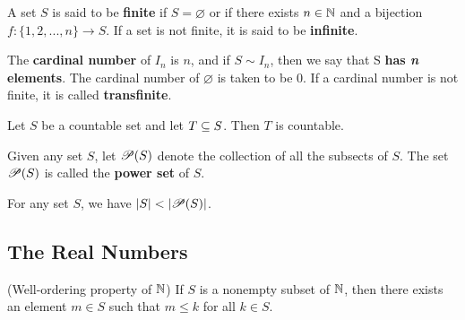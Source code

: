 \documentclass[12pt]{article}
\begin{document}
\begin{definition}
  A set $S$ is said to be \textbf{finite} if $S = \varnothing$ or if there
  exists $n \in \mathbb{N}$ and a bijection $f : \{ 1, 2, ..., n \} \rightarrow S$. If a set
  is not finite, it is said to be \textbf{infinite}.
\end{definition}

\begin{definition}
  The \textbf{cardinal number} of $I_n$ is $n$, and if $S \sim I_n$, then we say
  that S \textbf{has \textit{n} elements}. The cardinal number of
  $\varnothing$ is taken to be 0. If a cardinal number is not finite, it is
  called \textbf{transfinite}.
\end{definition}

\begin{theorem}
  Let $S$ be a countable set and let $T \subseteq S$. Then $T$ is countable.
\end{theorem}

\begin{definition}
  Given any set $S$, let $\mathscr{P}(S)$ denote the collection of all the subsects
  of $S$. The set $\mathscr{P}(S)$ is called the \textbf{power set} of $S$.
\end{definition}

\begin{theorem}
  For any set $S$, we have $\left|S\right| < \left|\mathscr{P}(S)\right|$.
\end{theorem}

\subsection{The Real Numbers}
\label{sec:org4624654}
\begin{axiom}
  (Well-ordering property of $\mathbb{N}$) If $S$ is a nonempty subset of
  $\mathbb{N}$, then there exists an element $m \in S$ such that $m \le k$ for all
  $k \in S$.
\end{axiom}
\end{document}
